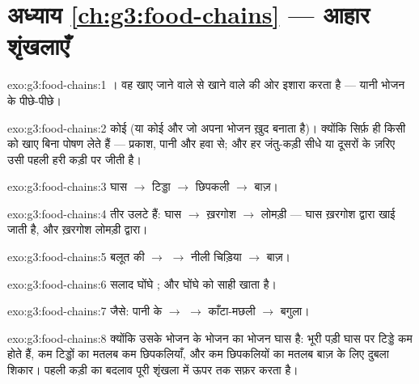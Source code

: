 \section*{अध्याय \ref{ch:g3:food-chains} --- आहार शृंखलाएँ}

\begin{solution}{exo:g3:food-chains:1}
। वह खाए जाने वाले से खाने वाले की ओर इशारा
करता है --- यानी भोजन के पीछे-पीछे।
\end{solution}

\begin{solution}{exo:g3:food-chains:2}
कोई  (या कोई और  जो अपना भोजन ख़ुद बनाता है)। क्योंकि सिर्फ़
 ही किसी को खाए बिना पोषण लेते हैं --- प्रकाश, पानी और हवा से; और
हर जंतु-कड़ी सीधे या दूसरों के ज़रिए उसी पहली हरी कड़ी पर जीती है।
\end{solution}

\begin{solution}{exo:g3:food-chains:3}
घास $\rightarrow$ टिड्डा $\rightarrow$ छिपकली
$\rightarrow$ बाज़।
\end{solution}

\begin{solution}{exo:g3:food-chains:4}
तीर उलटे हैं: घास $\rightarrow$ ख़रगोश
$\rightarrow$ लोमड़ी --- घास ख़रगोश द्वारा खाई जाती है, और ख़रगोश
लोमड़ी द्वारा।
\end{solution}

\begin{solution}{exo:g3:food-chains:5}
बलूत की  $\rightarrow$  $\rightarrow$ नीली चिड़िया
$\rightarrow$ बाज़।
\end{solution}

\begin{solution}{exo:g3:food-chains:6}
सलाद घोंघे ; और घोंघे को साही खाता है।
\end{solution}

\begin{solution}{exo:g3:food-chains:7}
जैसे: पानी के  $\rightarrow$  $\rightarrow$
काँटा-मछली $\rightarrow$ बगुला।
\end{solution}

\begin{solution}{exo:g3:food-chains:8}
क्योंकि उसके भोजन के भोजन का भोजन घास है: भूरी पड़ी घास पर टिड्डे कम
होते हैं, कम टिड्डों का मतलब कम छिपकलियाँ, और कम छिपकलियों का मतलब
बाज़ के लिए दुबला शिकार। पहली कड़ी का बदलाव पूरी शृंखला में ऊपर तक
सफ़र करता है।
\end{solution}

